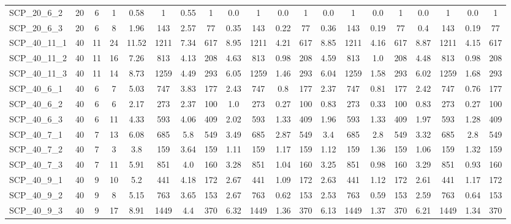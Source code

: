 \begin{sidewaystable}[!ht]
{\begin{tabular}{lccccccccccccccccccc}
SCP\_20\_6\_2 & 20 & 6 & 1 & 0.58 & 1 & 0.55 & 1 &  \textcolor{blue2}{0.0} & 1 &  \textcolor{blue2}{0.0} & 1 &  \textcolor{blue2}{0.0} & 1 &  \textcolor{blue2}{0.0} & 1 &  \textcolor{blue2}{0.0} & 1 &  \textcolor{blue2}{0.0} & 1 \\
SCP\_20\_6\_3 & 20 & 6 & 8 & 1.96 & 143 & 2.57 & 77 & 0.35 & 143 & 0.22 & 77 & 0.36 & 143 & 0.19 & 77 & 0.4 & 143 & 0.19 & 77 \\
SCP\_40\_11\_1 & 40 & 11 & 24 & 11.52 & 1211 & 7.34 & 617 & 8.95 & 1211 & 4.21 & 617 & 8.85 & 1211 & 4.16 & 617 & 8.87 & 1211 & 4.15 & 617 \\
SCP\_40\_11\_2 & 40 & 11 & 16 & 7.26 & 813 & 4.13 & 208 & 4.63 & 813 & 0.98 & 208 & 4.59 & 813 & 1.0 & 208 & 4.48 & 813 & 0.98 & 208 \\
SCP\_40\_11\_3 & 40 & 11 & 14 & 8.73 & 1259 & 4.49 & 293 & 6.05 & 1259 &  \textcolor{blue2}{1.46} & 293 & 6.04 & 1259 & 1.58 & 293 & 6.02 & 1259 & 1.68 & 293 \\
SCP\_40\_6\_1 & 40 & 6 & 7 & 5.03 & 747 & 3.83 & 177 & 2.43 & 747 & 0.8 & 177 & 2.37 & 747 & 0.81 & 177 & 2.42 & 747 &  \textcolor{blue2}{0.76} & 177 \\
SCP\_40\_6\_2 & 40 & 6 & 6 & 2.17 & 273 & 2.37 & 100 & 1.0 & 273 & 0.27 & 100 & 0.83 & 273 & 0.33 & 100 & 0.83 & 273 & 0.27 & 100 \\
SCP\_40\_6\_3 & 40 & 6 & 11 & 4.33 & 593 & 4.06 & 409 & 2.02 & 593 & 1.33 & 409 & 1.96 & 593 & 1.33 & 409 & 1.97 & 593 &  \textcolor{blue2}{1.28} & 409 \\
SCP\_40\_7\_1 & 40 & 7 & 13 & 6.08 & 685 & 5.8 & 549 & 3.49 & 685 & 2.87 & 549 & 3.4 & 685 & 2.8 & 549 & 3.32 & 685 & 2.8 & 549 \\
SCP\_40\_7\_2 & 40 & 7 & 3 & 3.8 & 159 & 3.64 & 159 & 1.11 & 159 & 1.17 & 159 & 1.12 & 159 & 1.36 & 159 &  \textcolor{blue2}{1.06} & 159 & 1.32 & 159 \\
SCP\_40\_7\_3 & 40 & 7 & 11 & 5.91 & 851 & 4.0 & 160 & 3.28 & 851 & 1.04 & 160 & 3.25 & 851 & 0.98 & 160 & 3.29 & 851 &  \textcolor{blue2}{0.93} & 160 \\
SCP\_40\_9\_1 & 40 & 9 & 10 & 5.2 & 441 & 4.18 & 172 & 2.67 & 441 & 1.09 & 172 & 2.63 & 441 & 1.12 & 172 & 2.61 & 441 & 1.17 & 172 \\
SCP\_40\_9\_2 & 40 & 9 & 8 & 5.15 & 763 & 3.65 & 153 & 2.67 & 763 & 0.62 & 153 & 2.53 & 763 & 0.59 & 153 & 2.59 & 763 & 0.64 & 153 \\
SCP\_40\_9\_3 & 40 & 9 & 17 & 8.91 & 1449 & 4.4 & 370 & 6.32 & 1449 & 1.36 & 370 & 6.13 & 1449 & 1.37 & 370 & 6.21 & 1449 & 1.34 & 370 \\

\end{tabular}}
\end{sidewaystable}
